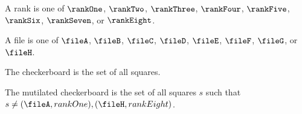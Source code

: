 




%
%
\begin{inductive}
   A rank is one of
   $\rankOne$, $\rankTwo$, $\rankThree$, $\rankFour$, $\rankFive$, $\rankSix$, $\rankSeven$, or $\rankEight$.
\end{inductive}



%
\begin{inductive}
   A file is one of
   $\fileA$, $\fileB$, $\fileC$, $\fileD$, $\fileE$, $\fileF$, $\fileG$, or $\fileH$.
\end{inductive}






\begin{definition}
   The checkerboard is the set of all squares.
\end{definition}






\begin{definition}
   The mutilated checkerboard is the set of all squares $s$
   such that $s \neq (\fileA, rankOne), (\fileH, rankEight)$.
\end{definition}




